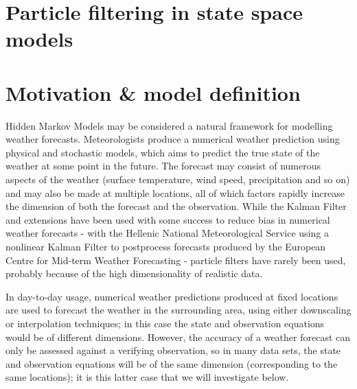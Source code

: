 \documentclass[10pt,fleqn]{article}
\begin{document}
\section*{Particle filtering in state space models}

\section{Motivation \& model definition}

Hidden Markov Models may be considered a natural framework for modelling weather forecasts. Meteorologists produce a numerical weather prediction using physical and stochastic models, which aims to predict the true state of the weather at some point in the future. The forecast may consist of numerous aspects of the weather (surface temperature, wind speed, precipitation and so on) and may also be made at multiple locations, all of which factors rapidly increase the dimension of both the forecast and the observation.
%
While the Kalman Filter and extensions have been used with some success to reduce bias in numerical weather forecasts - with the Hellenic National Meteorological Service using a nonlinear Kalman Filter to postprocess forecasts produced by the European Centre for Mid-term Weather Forecasting - particle filters have rarely been used, probably because of the high dimensionality of realistic data.

In day-to-day usage, numerical weather predictions produced at fixed locations are used to forecast the weather in the surrounding area, using either downscaling or interpolation techniques; in this case the state and observation equations would be of different dimensions. However, the accuracy of a weather forecast can only be assessed against a verifying observation, so in many data sets, the state and observation equations will be of the same dimension (corresponding to the same locations); it is this latter case that we will investigate below.
\end{document}
